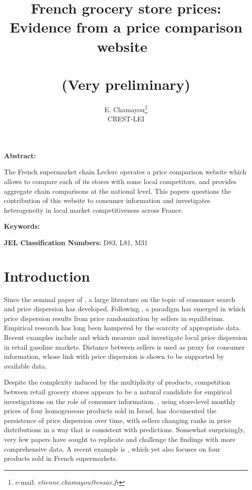 \documentclass[english]{article}
\begin{document}
\title{French grocery store prices: Evidence from a price comparison website\ \\ \ \\(Very preliminary)}
\author{E. Chamayou\thanks{e-mail:
\textit{etienne.chamayou@ensae.fr}} \\ CREST-LEI}
\maketitle

\sloppy%

\onehalfspacing

\textbf{Abstract:}

The French supermarket chain Leclerc operates a price comparison website which allows to compare each of its stores with some local competitors, and provides aggregate chain comparisons at the national level. This papers questions the contribution of this website to consumer information and investigates heterogeneity in local market competitiveness across France.

\strut

\textbf{Keywords:}

\strut

\textbf{JEL Classification Numbers:} D83, L81, M31

\pagebreak%

\section{Introduction}

Since the seminal paper of \cite{STI61}, a large literature on the topic of consumer search and price dispersion has developed. Following \cite{VAR80}, a paradigm has emerged in which price dispersion results from price randomization by sellers in equilibrium. Empirical research has long been hampered by the scarcity of appropriate data. Recent examples include \cite{TAP11} and \cite{CHA15} which measure and investigate local price dispersion in retail gasoline markets. Distance between sellers is used as proxy for consumer information, whose link with price dispersion is shown to be supported by available data.

Despite the complexity induced by the multiplicity of products, competition between retail grocery stores appears to be a natural candidate for empirical investigations on the role of consumer information. \cite{LAC02}, using store-level monthly prices of four homogeneous products sold in Israel, has documented the persistence of price dispersion over time, with sellers changing ranks in price distributions in a way that is consistent with \cite{VAR80} predictions. Somewhat surprisingly, very few papers have sought to replicate and challenge the findings with more comprehensive data. A recent example is \cite{DUB15}, which yet also focuses on four products sold in French supermarkets.
\end{document}
